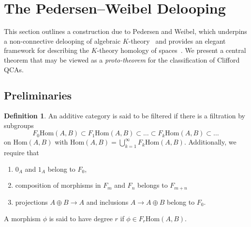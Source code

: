 \documentclass{article}
\theoremstyle{definition}
\newtheorem{defn}[theorem]{Definition}
\newcommand{\Hom}{\mathrm{Hom}}
\begin{document}
\section{The Pedersen--Weibel Delooping}
This section outlines a construction due to Pedersen and Weibel, which underpins a non-connective delooping of algebraic $K$-theory~\cite{pedersen1982ki, pedersen2006nonconnective} and provides an elegant framework for describing the $K$-theory homology of spaces~\cite{pedersen1989k}. We present a central theorem that may be viewed as a \emph{proto-theorem} for the classification of Clifford QCAs.

\subsection{Preliminaries}
\begin{defn}
    An additive category is said to be filtered if there is a filtration by subgroups
    $$F_0\Hom(A,B)\subset F_1\Hom(A,B)\subset \dots \subset F_k\Hom(A,B)\subset \dots$$
    on $\Hom(A,B)$ with $\Hom(A,B)=\bigcup_{k=1}^\infty F_k\Hom(A,B)$. Additionally, we require that 
    \begin{enumerate}
        \item $0_A$ and $1_A$ belong to $F_0$,
        \item composition of morphisms in $F_m$ and $F_n$ belongs to $F_{m+n}$
        \item projections $A\oplus B\rightarrow A$ and inclusions $A\rightarrow A\oplus B$ belong to $F_0$.
    \end{enumerate}
     A morphism $\phi$ is said to have degree $r$ if $\phi\in F_r\Hom(A,B)$.
\end{defn}
 
\end{document}
